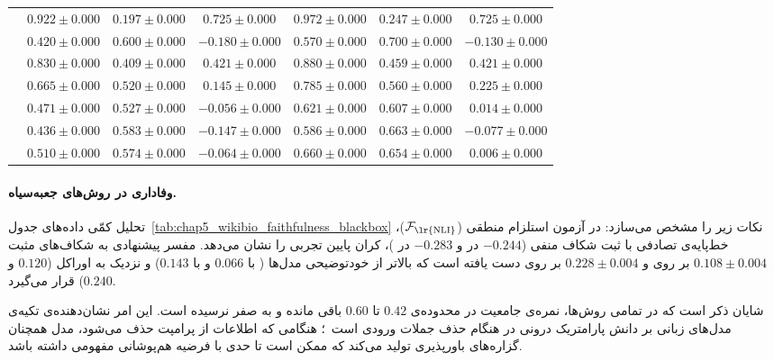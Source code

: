 \begin{table}[ht]
\begin{tabular}{l !{\color{black}\vline} ccc !{\color{black}\vline} ccc}
          & $\mathbf{0.922} \pm 0.000$ & $\mathbf{0.197} \pm 0.000$ & $\mathbf{0.725} \pm 0.000$ & $\mathbf{0.972} \pm 0.000$ & $\mathbf{0.247} \pm 0.000$ & $\mathbf{0.725} \pm 0.000$ \\
          & $0.420 \pm 0.000$ & $0.600 \pm 0.000$ & $-0.180 \pm 0.000$ & $0.570 \pm 0.000$ & $0.700 \pm 0.000$ & $-0.130 \pm 0.000$ \\
        \midrule
         & $0.830 \pm 0.000$ & $0.409 \pm 0.000$ & $0.421 \pm 0.000$ & $0.880 \pm 0.000$ & $0.459 \pm 0.000$ & $0.421 \pm 0.000$ \\
         & $0.665 \pm 0.000$ & $0.520 \pm 0.000$ & $0.145 \pm 0.000$ & $0.785 \pm 0.000$ & $0.560 \pm 0.000$ & $0.225 \pm 0.000$ \\
         & $0.471 \pm 0.000$ & $0.527 \pm 0.000$ & $-0.056 \pm 0.000$ & $0.621 \pm 0.000$ & $0.607 \pm 0.000$ & $0.014 \pm 0.000$ \\
         & $0.436 \pm 0.000$ & $0.583 \pm 0.000$ & $-0.147 \pm 0.000$ & $0.586 \pm 0.000$ & $0.663 \pm 0.000$ & $-0.077 \pm 0.000$ \\
         & $0.510 \pm 0.000$ & $0.574 \pm 0.000$ & $-0.064 \pm 0.000$ & $0.660 \pm 0.000$ & $0.654 \pm 0.000$ & $0.006 \pm 0.000$ \\
        \bottomrule
    \end{tabular}
\end{table}
\vspace{-0.35cm}

\paragraph{وفاداری در روش‌های جعبه‌سیاه.}
تحلیل کمّی داده‌های جدول~\ref{tab:chap5_wikibio_faithfulness_blackbox} نکات زیر را مشخص می‌سازد:
در آزمون استلزام منطقی ($\mathcal{F}_{\text{\lr{NLI}}}$)، خط‌پایه‌ی تصادفی با ثبت شکاف منفی ($-0.244$ در  و $-0.283$ در )، کران پایین تجربی را نشان می‌دهد. مفسر پیشنهادی  به شکاف‌های مثبت $0.108 \pm 0.004$ بر روی  و $0.228 \pm 0.004$ بر روی  دست یافته است که بالاتر از خودتوضیحی مدل‌ها ( با $0.066$ و  با $0.143$) و نزدیک به اوراکل  ($0.120$ و $0.240$) قرار می‌گیرد.

شایان ذکر است که در تمامی روش‌ها، نمره‌ی جامعیت در محدوده‌ی $0.42$ تا $0.60$ باقی مانده و به صفر نرسیده است. این امر نشان‌دهنده‌ی تکیه‌ی مدل‌های زبانی بر دانش پارامتریک درونی در هنگام حذف جملات ورودی است~\cite{kamahi2024counterfactuals}؛ هنگامی که اطلاعات از پرامپت حذف می‌شود، مدل همچنان گزاره‌های باورپذیری تولید می‌کند که ممکن است تا حدی با فرضیه هم‌پوشانی مفهومی داشته باشد.

